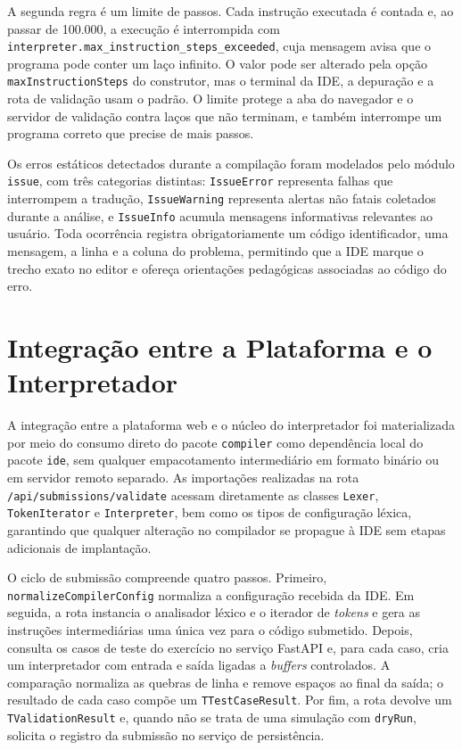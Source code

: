 A segunda regra é um limite de passos. Cada instrução executada é contada e, ao passar de 100.000, a execução é interrompida com \texttt{interpreter.\allowbreak{}max\_\allowbreak{}instruction\_\allowbreak{}steps\_\allowbreak{}exceeded}, cuja mensagem avisa que o programa pode conter um laço infinito. O valor pode ser alterado pela opção \texttt{maxInstructionSteps} do construtor, mas o terminal da IDE, a depuração e a rota de validação usam o padrão. O limite protege a aba do navegador e o servidor de validação contra laços que não terminam, e também interrompe um programa correto que precise de mais passos.

Os erros estáticos detectados durante a compilação foram modelados pelo módulo \texttt{issue}, com três categorias distintas: \texttt{IssueError} representa falhas que interrompem a tradução, \texttt{IssueWarning} representa alertas não fatais coletados durante a análise, e \texttt{Issue}\allowbreak\texttt{Info} acumula mensagens informativas relevantes ao usuário. Toda ocorrência registra obrigatoriamente um código identificador, uma mensagem, a linha e a coluna do problema, permitindo que a IDE marque o trecho exato no editor e ofereça orientações pedagógicas associadas ao código do erro.

\section{Integração entre a Plataforma e o Interpretador}
\label{sec:integracao-plataforma}

A integração entre a plataforma web e o núcleo do interpretador foi materializada por meio do consumo direto do pacote \texttt{compiler} como dependência local do pacote \texttt{ide}, sem qualquer empacotamento intermediário em formato binário ou em servidor remoto separado. As importações realizadas na rota \texttt{/api/submissions/}\allowbreak\texttt{validate} acessam diretamente as classes \texttt{Lexer}, \texttt{TokenIterator} e \texttt{Interpreter}, bem como os tipos de configuração léxica, garantindo que qualquer alteração no compilador se propague à IDE sem etapas adicionais de implantação.

O ciclo de submissão compreende quatro passos. Primeiro, \texttt{normalizeCompilerConfig} normaliza a configuração recebida da IDE. Em seguida, a rota instancia o analisador léxico e o iterador de \textit{tokens} e gera as instruções intermediárias uma única vez para o código submetido. Depois, consulta os casos de teste do exercício no serviço FastAPI e, para cada caso, cria um interpretador com entrada e saída ligadas a \textit{buffers} controlados. A comparação normaliza as quebras de linha e remove espaços ao final da saída; o resultado de cada caso compõe um \texttt{TTestCaseResult}. Por fim, a rota devolve um \texttt{TValidationResult} e, quando não se trata de uma simulação com \texttt{dryRun}, solicita o registro da submissão no serviço de persistência.

